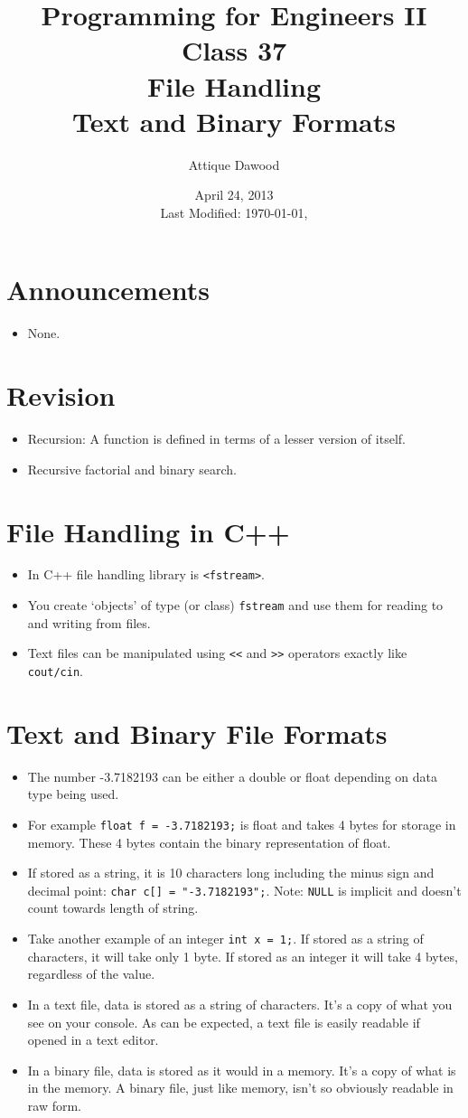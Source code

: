 \documentclass[12pt,a4paper]{article}
\title{\vspace{-2cm}Programming for Engineers II\\Class 37\\File Handling\\Text and Binary Formats}
\author{Attique Dawood}
\date{April 24, 2013\\[0.2cm] Last Modified: \today, \currenttime}
\begin{document}
\maketitle
\section{Announcements}
\begin{itemize}
\item None.
\end{itemize}
\section{Revision}
\begin{itemize}
\item Recursion: A function is defined in terms of a lesser version of itself.
\item Recursive factorial and binary search.
\end{itemize}
\section{File Handling in C++}
\begin{itemize}
\item In C++ file handling library is \verb|<fstream>|.
\item You create `objects' of type (or class) \verb|fstream| and use them for reading to and writing from files.
\item Text files can be manipulated using \verb|<<| and \verb|>>| operators exactly like \verb|cout/cin|.
\end{itemize}
\section{Text and Binary File Formats}
\begin{itemize}
\item The number -3.7182193 can be either a double or float depending on data type being used.
\item For example \verb|float f = -3.7182193;| is float and takes 4 bytes for storage in memory. These 4 bytes contain the binary representation of float.
\item If stored as a string, it is 10 characters long including the minus sign and decimal point: \verb|char c[] = "-3.7182193";|. Note: \verb|NULL| is implicit and doesn't count towards length of string.
\item Take another example of an integer \verb|int x = 1;|. If stored as a string of characters, it will take only 1 byte. If stored as an integer it will take 4 bytes, regardless of the value.
\item In a text file, data is stored as a string of characters. It's a copy of what you see on your console. As can be expected, a text file is easily readable if opened in a text editor.
\item In a binary file, data is stored as it would in a memory. It's a copy of what is in the memory. A binary file, just like memory, isn't so obviously readable in raw form.
\end{itemize}
\end{document}
